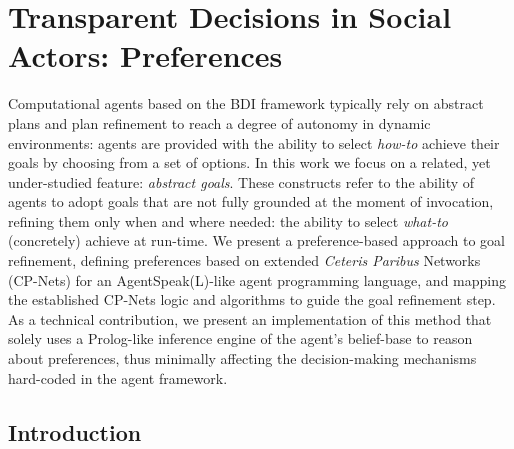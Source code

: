\chapter{Transparent Decisions in Social Actors: Preferences}

Computational agents based on the BDI framework typically rely on abstract plans and plan refinement to reach a degree of autonomy in dynamic environments: agents are provided with the 
ability to select \textit{how-to} achieve their goals by choosing from a set of options. In this work we focus on a related, yet under-studied feature: \textit{abstract goals}. These constructs refer to the ability of agents to adopt goals that are not fully grounded at the moment of invocation, refining them only when and where needed: the ability to select \textit{what-to} (concretely) achieve at run-time. We present a preference-based approach to goal refinement,  defining preferences based on extended \textit{Ceteris Paribus} Networks (CP-Nets) for an AgentSpeak(L)-like agent programming language, and mapping the established CP-Nets logic and algorithms to guide the goal refinement step. As a technical contribution, we present an implementation of this method that solely uses a Prolog-like inference engine of the agent's belief-base to reason about preferences, thus minimally affecting the decision-making mechanisms hard-coded in the agent framework.


\section{Introduction}


